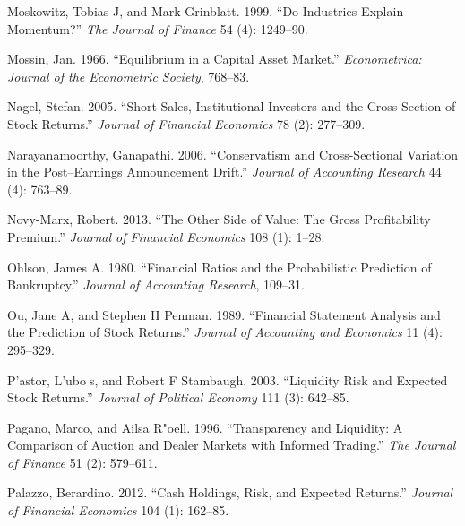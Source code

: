 \documentclass[
  letterpaper,
  DIV=11,
  numbers=noendperiod]{scrreprt}
\newlength{\cslhangindent}
\newlength{\cslentryspacingunit} %
\newenvironment{CSLReferences}[2] %
 {%
  \setlength{\parindent}{0pt}
  \ifodd #1
  \let\oldpar\par
  \def\par{\hangindent=\cslhangindent\oldpar}
  \fi
  \setlength{\parskip}{#2\cslentryspacingunit}
 }%
 {}
\begin{document}
\begin{CSLReferences}{1}{0}
\leavevmode{}%
Moskowitz, Tobias J, and Mark Grinblatt. 1999. {``Do Industries Explain
Momentum?''} \emph{The Journal of Finance} 54 (4): 1249--90.

\leavevmode{}%
Mossin, Jan. 1966. {``Equilibrium in a Capital Asset Market.''}
\emph{Econometrica: Journal of the Econometric Society}, 768--83.

\leavevmode{}%
Nagel, Stefan. 2005. {``Short Sales, Institutional Investors and the
Cross-Section of Stock Returns.''} \emph{Journal of Financial Economics}
78 (2): 277--309.

\leavevmode{}%
Narayanamoorthy, Ganapathi. 2006. {``Conservatism and Cross-Sectional
Variation in the Post--Earnings Announcement Drift.''} \emph{Journal of
Accounting Research} 44 (4): 763--89.

\leavevmode{}%
Novy-Marx, Robert. 2013. {``The Other Side of Value: The Gross
Profitability Premium.''} \emph{Journal of Financial Economics} 108 (1):
1--28.

\leavevmode{}%
Ohlson, James A. 1980. {``Financial Ratios and the Probabilistic
Prediction of Bankruptcy.''} \emph{Journal of Accounting Research},
109--31.

\leavevmode{}%
Ou, Jane A, and Stephen H Penman. 1989. {``Financial Statement Analysis
and the Prediction of Stock Returns.''} \emph{Journal of Accounting and
Economics} 11 (4): 295--329.

\leavevmode{}%
P'astor, L'ubos, and Robert F Stambaugh. 2003. {``Liquidity Risk and
Expected Stock Returns.''} \emph{Journal of Political Economy} 111 (3):
642--85.

\leavevmode{}%
Pagano, Marco, and Ailsa R"oell. 1996. {``Transparency and Liquidity: A
Comparison of Auction and Dealer Markets with Informed Trading.''}
\emph{The Journal of Finance} 51 (2): 579--611.

\leavevmode{}%
Palazzo, Berardino. 2012. {``Cash Holdings, Risk, and Expected
Returns.''} \emph{Journal of Financial Economics} 104 (1): 162--85.


\end{CSLReferences}
\end{document}
